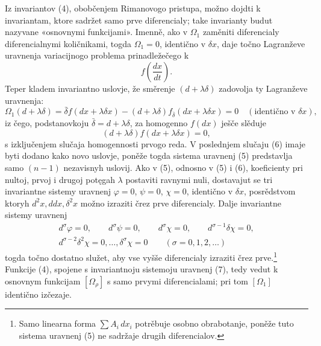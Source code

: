 \documentclass[11pt]{article}
\providecommand{\bdelta}{\bar{\delta}}
\begin{document}
Iz invariantov (4), obobčenjem Rimanovogo pristupa, možno dojdti k invariantam, ktore sadržet samo prve diferencialy; take invarianty budut nazyvane «osnovnymi funkcijami». Imenně, ako v \(\Omega_1\) zaměniti diferencialy diferencialnymi količnikami, togda \(\Omega_1=0\), identično v \(\delta x\), daje točno Lagranževe uravnenja variacijnogo problema prinadležečego k
\[
f\!\left(\frac{dx}{dt}\right).
\]
Teper kladem invariantno uslovje, že směrenje \((d+\lambda\delta)\) zadovolja ty Lagranževe uravnenja:
\begin{equation}
\Omega_1(d+\lambda\delta)=
\bdelta f(dx+\lambda\delta x)
-(d+\lambda\delta)f_{\bdelta}(dx+\lambda\delta x)=0
\quad(\text{identično v }\delta x),
\tag{5}
\end{equation}
iz čego, podstanovkoju \(\bdelta=d+\lambda\delta\), za homogenno \(f(dx)\) ješče slěduje
\begin{equation}
(d+\lambda\delta)f(dx+\lambda\delta x)=0,
\tag{6}
\end{equation}
s izključenjem slučaja homogennosti prvogo reda. V poslednjem slučaju (6) imaje byti dodano kako novo uslovje, poněže togda sistema uravnenj (5) predstavlja samo \((n-1)\) nezavisnyh uslovij. Ako v (5), odnosno v (5) i (6), koeficienty pri nultoj, prvoj i drugoj potęgah \(\lambda\) postaviti ravnymi nuli, dostavajut se tri invariantne sistemy uravnenj
\(\varphi=0\), \(\psi=0\), \(\chi=0\), identično v \(\delta x\), posrědstvom ktoryh \(d^2x,ddx,\delta^2x\) možno izraziti črez prve diferencialy. Dalje invariantne sistemy uravnenj
\begin{equation}
\begin{gathered}
d^\sigma\varphi=0,\qquad d^\sigma\psi=0,\qquad
d^\sigma\chi=0,\qquad d^{\sigma-1}\delta\chi=0,\\
d^{\sigma-2}\delta^2\chi=0,\ldots,\delta^\sigma\chi=0
\qquad(\sigma=0,1,2,\ldots)
\end{gathered}
\tag{7}
\end{equation}
togda točno dostatno služet, aby vse vyšše diferencialy izraziti črez prve.\footnote{Samo linearna forma \(\sum A_i\,dx_i\) potrěbuje osobno obrabotanje, poněže tuto sistema uravnenj (5) ne sadržaje drugih diferencialov.} Funkcije (4), spojene s invariantnoju sistemoju uravnenj (7), tedy vedut k osnovnym funkcijam \([\Omega_\rho]\) s samo prvymi diferencialami; pri tom \([\Omega_1]\) identično izčezaje.
\end{document}
